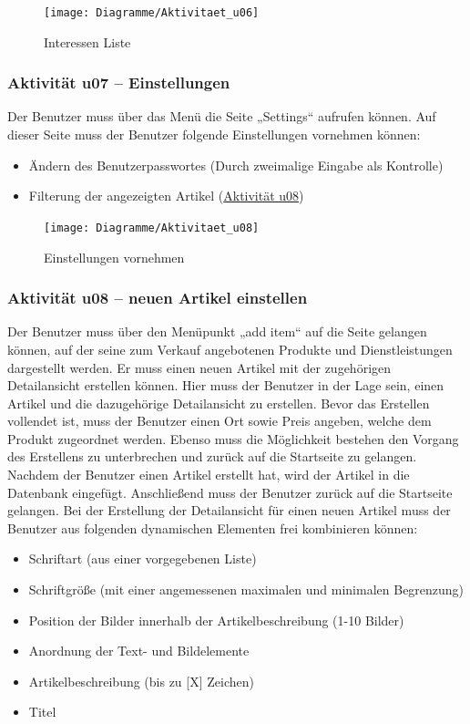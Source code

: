 \documentclass[a4paper,12pt,oneside]{scrartcl}
\begin{document}
\begin{figure}[!htbp]
\centering
\noindent\texttt{[image: Diagramme/Aktivitaet\_u06]}
\caption{Interessen Liste}
\end{figure}
\FloatBarrier


\subsubsection{Aktivität u07 – Einstellungen}
Der Benutzer muss über das Menü die Seite „Settings“ aufrufen können. Auf dieser Seite muss der Benutzer folgende Einstellungen vornehmen können:
\begin{itemize}
	\item Ändern des Benutzerpasswortes (Durch zweimalige Eingabe als Kontrolle)
	\item Filterung der angezeigten Artikel (\hyperlink{u08}{Aktivität u08})
\end{itemize}

\begin{figure}[!htbp]
\centering
\noindent\texttt{[image: Diagramme/Aktivitaet\_u08]}
\caption{Einstellungen vornehmen}
\end{figure}
\FloatBarrier


\hypertarget{u08}{\subsubsection{Aktivität u08 – neuen Artikel einstellen}}
Der Benutzer muss über den Menüpunkt „add item“ auf die Seite gelangen können, auf der seine zum Verkauf angebotenen Produkte und Dienstleistungen dargestellt werden. Er muss einen neuen Artikel mit der  zugehörigen Detailansicht erstellen können. Hier muss der Benutzer in der Lage sein, einen Artikel und die dazugehörige Detailansicht zu erstellen. Bevor das Erstellen vollendet ist, muss der Benutzer einen Ort sowie Preis angeben, welche dem Produkt zugeordnet werden. Ebenso muss die Möglichkeit bestehen den Vorgang des Erstellens zu unterbrechen und zurück auf die Startseite zu gelangen. Nachdem der Benutzer einen Artikel erstellt hat, wird der Artikel in die Datenbank eingefügt. Anschließend muss der Benutzer zurück auf die Startseite gelangen. 
Bei der Erstellung der Detailansicht für einen neuen Artikel muss der Benutzer aus folgenden dynamischen Elementen frei kombinieren können:
\begin{itemize}
	\item Schriftart (aus einer vorgegebenen Liste)
	\item Schriftgröße (mit einer angemessenen maximalen und minimalen Begrenzung)
	\item Position der Bilder innerhalb der Artikelbeschreibung (1-10 Bilder)
	\item Anordnung der Text- und Bildelemente
	\item Artikelbeschreibung (bis zu [X] Zeichen)
	\item Titel
\end{itemize}
\end{document}
